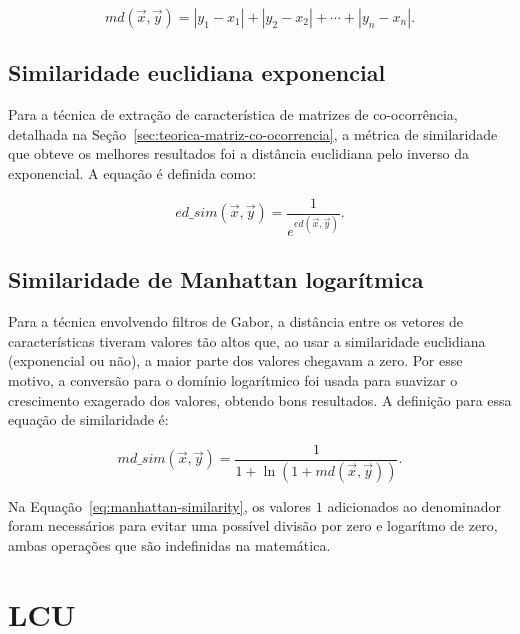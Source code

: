 \begin{equation}\label{eq:manhattan-distance}
md(\vec{x}, \vec{y}) = |y_1-x_1| + |y_2-x_2| + \cdots + |y_n-x_n|.
\end{equation}

\subsection{Similaridade euclidiana exponencial}\label{sec:teorica-similaridade-euclidiana}

Para a técnica de extração de característica de matrizes de co-ocorrência,
detalhada na Seção~\ref{sec:teorica-matriz-co-ocorrencia}, a métrica de
similaridade que obteve os melhores resultados foi a distância
euclidiana pelo inverso da exponencial. A equação é definida como:

\begin{equation}\label{eq:euclidian-similarity}
  ed\_sim(\vec{x}, \vec{y}) = \dfrac{1}{e^{ed(\vec{x}, \vec{y})}}.
\end{equation}

\subsection{Similaridade de Manhattan logarítmica}\label{sec:teorica-similaridade-manhattan}

Para a técnica envolvendo filtros de Gabor, a distância entre os
vetores de características tiveram valores tão altos que, ao usar a
similaridade euclidiana (exponencial ou não), a maior parte dos valores
chegavam a zero. Por esse motivo, a conversão para o domínio
logarítmico foi usada para suavizar o crescimento exagerado dos
valores, obtendo bons resultados. A definição para essa equação de
similaridade é:

\begin{equation}\label{eq:manhattan-similarity}
  md\_sim(\vec{x}, \vec{y}) = \dfrac{1}{1 + \ln(1 + md(\vec{x}, \vec{y}))}.
\end{equation}

Na Equação~\ref{eq:manhattan-similarity}, os valores $1$ adicionados
ao denominador foram necessários para evitar uma possível divisão por
zero e logarítmo de zero, ambas operações que são indefinidas na
matemática.

\newpage
\section{LCU}\label{sec:teorica-lcu}

